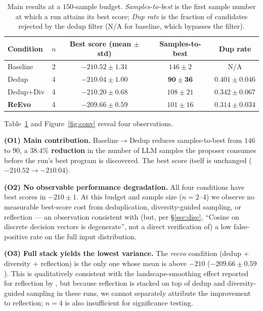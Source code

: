 \documentclass{article}
\begin{document}
\begin{table}[t]
\centering\small
\caption{Main results at a $150$-sample budget. \emph{Samples-to-best} is the first
sample number at which a run attains its best score; \emph{Dup rate} is the fraction
of candidates rejected by the dedup filter (N/A for baseline, which bypasses the
filter).}
\label{tab:main}
\begin{tabular}{lcccc}
\toprule
Condition & $n$ & Best score (mean $\pm$ std) & Samples-to-best & Dup rate \\
\midrule
Baseline   & 2 & $-210.52 \pm 1.31$ & $146 \pm 2$  & N/A \\
Dedup      & 4 & $-210.04 \pm 1.00$ & $\mathbf{90 \pm 36}$ & $0.401 \pm 0.046$ \\
Dedup+Div  & 4 & $-210.20 \pm 0.68$ & $108 \pm 21$ & $0.342 \pm 0.067$ \\
\textbf{ReEvo} & 4 & $\mathbf{-209.66 \pm 0.59}$ & $101 \pm 16$ & $0.314 \pm 0.034$ \\
\bottomrule
\end{tabular}
\end{table}

Table~\ref{tab:main} and Figure~\ref{fig:conv} reveal four observations.

\textbf{(O1) Main contribution.} Baseline$\to$Dedup reduces samples-to-best from $146$
to $90$, a \textbf{$38.4\%$ reduction} in the number of LLM samples the proposer
consumes before the run's best program is discovered. The best score itself is
unchanged ($-210.52\to -210.04$).

\textbf{(O2) No observable performance degradation.} All four conditions have best
scores in $-210\pm 1$. At this budget and sample size ($n{=}2$--$4$) we observe no
measurable best-score cost from deduplication, diversity-guided sampling, or reflection
--- an observation consistent with (but, per \S\ref{sec:disc}, ``Cosine on discrete decision vectors is degenerate'', not a direct
verification of) a low false-positive rate on the full input distribution.

\textbf{(O3) Full stack yields the lowest variance.} The \textit{reevo} condition
(dedup $+$ diversity $+$ reflection) is the only one whose mean is above $-210$
($-209.66 \pm 0.59$). This is qualitatively consistent with the landscape-smoothing
effect reported for reflection by \citet{ye2024reevo}, but because reflection is
stacked on top of dedup and diversity-guided sampling in these runs, we cannot
separately attribute the improvement to reflection; $n{=}4$ is also insufficient for
significance testing.
\end{document}
